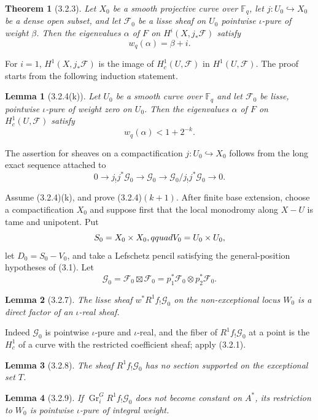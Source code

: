 \documentclass[11pt]{article}
\newtheorem{theorem}{Theorem}
\newtheorem{lemma}{Lemma}
\theoremstyle{remark}
\newcommand{\Fq}{\mathbb{F}_q}
\begin{document}
\begin{theorem}[3.2.3]
Let $X_0$ be a smooth projective curve over $\Fq$, let $j:U_0\hookrightarrow X_0$ be a dense open subset, and let $\mathcal F_0$ be a lisse sheaf on $U_0$ pointwise $\iota$-pure of weight $\beta$. Then the eigenvalues $\alpha$ of $F$ on $H^i(X,j_{*}\mathcal F)$ satisfy
\[
w_q(\alpha)=\beta+i .
\]
\end{theorem}

For $i=1$, $H^1(X,j_{*}\mathcal F)$ is the image of $H^1_c(U,\mathcal F)$ in $H^1(U,\mathcal F)$. The proof starts from the following induction statement.

\begin{lemma}[3.2.4(k)]
Let $U_0$ be a smooth curve over $\Fq$ and let $\mathcal F_0$ be lisse, pointwise $\iota$-pure of weight zero on $U_0$. Then the eigenvalues $\alpha$ of $F$ on $H^1_c(U,\mathcal F)$ satisfy
\[
w_q(\alpha)<1+2^{-k}.
\]
\end{lemma}

The assertion for sheaves on a compactification $j:U_0\hookrightarrow X_0$ follows from the long exact sequence attached to
\[
0\to j_{!}j^*\mathcal G_0\to \mathcal G_0\to \mathcal G_0/j_{!}j^*\mathcal G_0\to0.
\]

Assume (3.2.4)(k), and prove (3.2.4)$(k+1)$. After finite base extension, choose a compactification $X_0$ and suppose first that the local monodromy along $X-U$ is tame and unipotent. Put
\[
S_0=X_0\times X_0,\\qquad V_0=U_0\times U_0,
\]
let $D_0=S_0-V_0$, and take a Lefschetz pencil satisfying the general-position hypotheses of (3.1). Let
\[
\mathcal G_0=\mathcal F_0\boxtimes\mathcal F_0=p_1^*\mathcal F_0\otimes p_2^*\mathcal F_0.
\]

\begin{lemma}[3.2.7]
The lisse sheaf $w^*R^1f_{!}\mathcal G_0$ on the non-exceptional locus $W_0$ is a direct factor of an $\iota$-real sheaf.
\end{lemma}

Indeed $\mathcal G_0$ is pointwise $\iota$-pure and $\iota$-real, and the fiber of $R^1f_{!}\mathcal G_0$ at a point is the $H^1_c$ of a curve with the restricted coefficient sheaf; apply (3.2.1).

\begin{lemma}[3.2.8]
The sheaf $R^1f_{!}\mathcal G_0$ has no section supported on the exceptional set $T$.
\end{lemma}

\begin{lemma}[3.2.9]
If $\operatorname{Gr}^G_iR^1f_{!}\mathcal G_0$ does not become constant on $A^*$, its restriction to $W_0$ is pointwise $\iota$-pure of integral weight.
\end{lemma}
\end{document}
